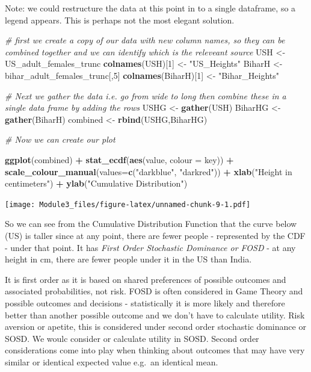 \documentclass[]{book}
\newenvironment{Shaded}{\begin{snugshade}}{\end{snugshade}}
\newcommand{\KeywordTok}[1]{\textcolor[rgb]{0.13,0.29,0.53}{\textbf{#1}}}
\newcommand{\DataTypeTok}[1]{\textcolor[rgb]{0.13,0.29,0.53}{#1}}
\newcommand{\DecValTok}[1]{\textcolor[rgb]{0.00,0.00,0.81}{#1}}
\newcommand{\StringTok}[1]{\textcolor[rgb]{0.31,0.60,0.02}{#1}}
\newcommand{\CommentTok}[1]{\textcolor[rgb]{0.56,0.35,0.01}{\textit{#1}}}
\newcommand{\OperatorTok}[1]{\textcolor[rgb]{0.81,0.36,0.00}{\textbf{#1}}}
\newcommand{\NormalTok}[1]{#1}
\theoremstyle{definition}
\theoremstyle{definition}
\theoremstyle{definition}
\theoremstyle{remark}
\begin{document}
Note: we could restructure the data at this point in to a single
dataframe, so a legend appears. This is perhaps not the most elegant
solution.

\begin{Shaded}
\begin{Highlighting}[]
\CommentTok{# first we create a copy of our data with new column names, so they can be combined together and we can identify which is the releveant source}
\NormalTok{USH <-}\StringTok{ }\NormalTok{US_adult_females_trunc }
\KeywordTok{colnames}\NormalTok{(USH)[}\DecValTok{1}\NormalTok{] <-}\StringTok{ "US_Heights"}
\NormalTok{BiharH <-}\StringTok{ }\NormalTok{bihar_adult_females_trunc[,}\DecValTok{5}\NormalTok{]}
\KeywordTok{colnames}\NormalTok{(BiharH)[}\DecValTok{1}\NormalTok{] <-}\StringTok{ "Bihar_Heights"}

\CommentTok{# Next we gather the data i.e. go from wide to long then combine these in a single data frame by adding the rows}
\NormalTok{USHG <-}\StringTok{ }\KeywordTok{gather}\NormalTok{(USH)}
\NormalTok{BiharHG <-}\StringTok{ }\KeywordTok{gather}\NormalTok{(BiharH)}
\NormalTok{combined <-}\StringTok{ }\KeywordTok{rbind}\NormalTok{(USHG,BiharHG)}

\CommentTok{# Now we can create our plot}

\KeywordTok{ggplot}\NormalTok{(combined) }\OperatorTok{+}\StringTok{ }
\StringTok{  }\KeywordTok{stat_ecdf}\NormalTok{(}\KeywordTok{aes}\NormalTok{(value, }\DataTypeTok{colour =}\NormalTok{ key)) }\OperatorTok{+}
\StringTok{  }\KeywordTok{scale_colour_manual}\NormalTok{(}\DataTypeTok{values=}\KeywordTok{c}\NormalTok{(}\StringTok{"darkblue"}\NormalTok{, }\StringTok{"darkred"}\NormalTok{)) }\OperatorTok{+}
\StringTok{  }\KeywordTok{xlab}\NormalTok{(}\StringTok{"Height in centimeters"}\NormalTok{) }\OperatorTok{+}\StringTok{ }
\StringTok{  }\KeywordTok{ylab}\NormalTok{(}\StringTok{"Cumulative Distribution"}\NormalTok{)}
\end{Highlighting}
\end{Shaded}

\texttt{[image: Module3\_files/figure-latex/unnamed-chunk-9-1.pdf]}

So we can see from the Cumulative Distribution Function that the curve
below (US) is taller since at any point, there are fewer people -
represented by the CDF - under that point. It has \emph{First Order
Stochastic Dominance or FOSD} - at any height in cm, there are fewer
people under it in the US than India.

It is first order as it is based on shared preferences of possible
outcomes and associated probabilities, not risk. FOSD is often
considered in Game Theory and possible outcomes and decisions -
statistically it is more likely and therefore better than another
possible outcome and we don't have to calculate utility. Risk aversion
or apetite, this is considered under second order stochastic dominance
or SOSD. We woulc consider or calculate utility in SOSD. Second order
considerations come into play when thinking about outcomes that may have
very similar or identical expected value e.g.~an identical mean.
\end{document}
